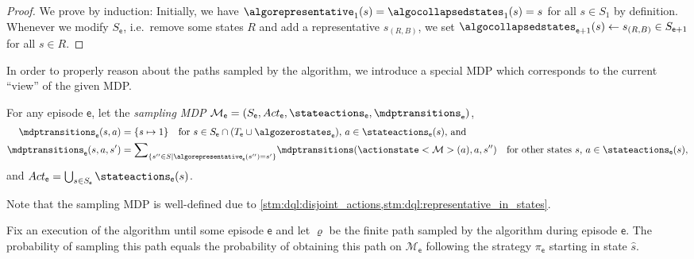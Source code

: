 \documentclass{article}
\newcommand{\unionSym}{\cup}
\newcommand{\unionBin}{\mathbin{\unionSym}}
\newcommand{\intersectionSym}{\cap}
\newcommand{\intersectionBin}{\mathbin{\intersectionSym}}
\newcommand{\UnionSym}{\bigcup}
\newcommand{\union}{\unionBin}
\newcommand{\intersection}{\intersectionBin}
\newcommand{\Union}{\UnionSym}
\newcommand{\MDP}{\mathcal{M}}
\newcommand{\States}{S}
\newcommand{\initialstate}{\hat{s}}
\newcommand{\Actions}{Act}
\newcommand{\finitepath}{\varrho}
\newcommand{\strategy}{\pi}
\newcommand{\targetset}{T}
\newcommand{\algoepisode}{\mathsf{e}}
\begin{document}
\begin{proof}
	We prove by induction:
	Initially, we have $\algorepresentative_1(s) = \algocollapsedstates_1(s) = s$ for all $s \in \States_1$ by definition.
	Whenever we modify $\States_\algoepisode$, i.e.\ remove some states $R$ and add a representative $s_{(R, B)}$, we set $\algocollapsedstates_{\algoepisode + 1}(s) \gets s_{(R, B)} \in \States_{\algoepisode + 1}$ for all $s \in R$. 
\end{proof}
In order to properly reason about the paths sampled by the algorithm, we introduce a special MDP which corresponds to the current \enquote{view} of the given MDP.
\begin{definition} \label{def:dql:sampling_mdp}
	For any episode $\algoepisode$, let the \emph{sampling MDP} $\MDP_\algoepisode = (\States_\algoepisode, \Actions_\algoepisode, \stateactions_\algoepisode, \mdptransitions_\algoepisode)$,
	\begin{align*}
		\mdptransitions_\algoepisode(s, a) & = \{s \mapsto 1\} \quad \text{for $s \in \States_\algoepisode \intersection (\targetset_\algoepisode \union \algozerostates_\algoepisode)$, $a \in \stateactions_\algoepisode(s)$, and} \\
		\mdptransitions_\algoepisode(s, a, s') & = {\sum}_{\{s'' \in \States \mid \algorepresentative_\algoepisode(s'') = s'\}} \mdptransitions(\actionstate<\MDP>(a), a, s'') \quad \text{for other states $s$, $a \in \stateactions_\algoepisode(s)$},
	\end{align*}
	and $\Actions_\algoepisode = \Union_{s \in \States_\algoepisode} \stateactions_\algoepisode(s)$.
\end{definition}
Note that the sampling MDP is well-defined due to \cref{stm:dql:disjoint_actions,stm:dql:representative_in_states}.
\begin{lemma} \label{stm:dql:sampling_mdp}
	Fix an execution of the algorithm until some episode $\algoepisode$ and let $\finitepath$ be the finite path sampled by the algorithm during episode $\algoepisode$.
	The probability of sampling this path equals the probability of obtaining this path on $\MDP_\algoepisode$ following the strategy $\strategy_\algoepisode$ starting in state $\initialstate$.
\end{lemma}
\end{document}
